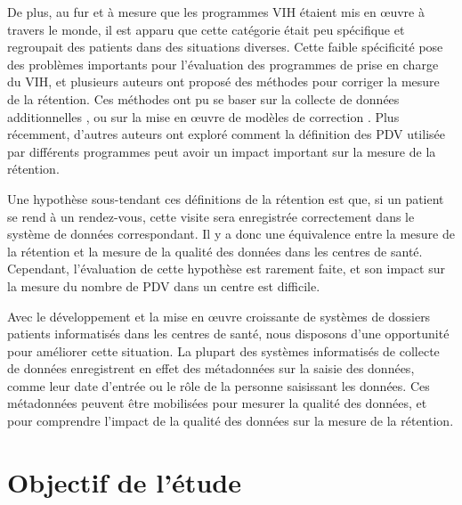 \documentclass[paper=a4, fontsize=11pt]{scrartcl}
\numberwithin{equation}{section}		%
\numberwithin{figure}{section}			%
\numberwithin{table}{section}				%
\begin{document}
De plus, au fur et à mesure que les programmes VIH étaient mis en \oe uvre à travers le monde, il est apparu que cette catégorie était peu spécifique et regroupait des patients dans des situations diverses\cite{kwong-leung_yu_true_2007,dalal_characteristics_2008,mcguire_vital_2010}. Cette faible spécificité pose des problèmes importants pour l'évaluation des programmes de prise en charge du VIH, et plusieurs auteurs ont proposé des méthodes pour corriger la mesure de la rétention. Ces méthodes ont pu se baser sur la collecte de données additionnelles \cite{yiannoutsos_sampling-based_2008,geng_tracking_2010,tassie_evaluation_2010}, ou sur la mise en \oe uvre de modèles de correction \cite{brinkhof_adjusting_2010,egger_correcting_2011,van_cutsem_correcting_2011,henriques_comparison_2012,verguet_incorporating_2013}. Plus récemment, d'autres auteurs ont exploré comment la définition des PDV utilisée par différents programmes peut avoir un impact important sur la mesure de la rétention\cite{chi_empirical_2010,chi_universal_2011,fox_defining_2012,mugavero_measuring_2012,yehia_comparing_2012,grimsrud_impact_2013,shepherd_impact_2013}.

Une hypothèse sous-tendant ces définitions de la rétention est que, si un patient se rend à un rendez-vous, cette visite sera enregistrée correctement dans le système de données correspondant. Il y a donc une équivalence entre la mesure de la rétention et la mesure de la qualité des données dans les centres de santé. Cependant, l'évaluation de cette hypothèse est rarement faite, et son impact sur la mesure du nombre de PDV dans un centre est difficile.

Avec le développement et la mise en \oe uvre croissante de systèmes de dossiers patients informatisés dans les centres de santé, nous disposons d'une opportunité pour améliorer cette situation. La plupart des systèmes informatisés de collecte de données enregistrent en effet des métadonnées sur la saisie des données, comme leur date d'entrée ou le rôle de la personne saisissant les données. Ces métadonnées peuvent être mobilisées pour mesurer la qualité des données, et pour comprendre l'impact de la qualité des données sur la mesure de la rétention.

\section{Objectif de l'étude}
\end{document}
